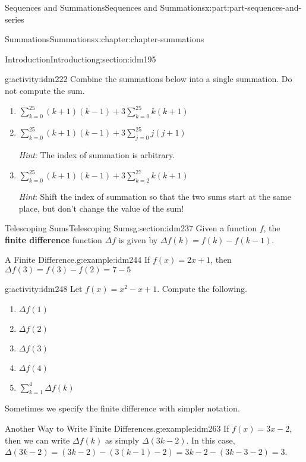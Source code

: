 \documentclass[oneside,10pt,]{book}
\newcommand{\terminology}[1]{\textbf{#1}}
\numberwithin{equation}{section}
\begin{document}
\begin{partptx}{Sequences and Summations}{}{Sequences and Summations}{}{}{x:part:part-sequences-and-series}
\begin{chapterptx}{Summations}{}{Summations}{}{}{x:chapter:chapter-summations}
\begin{sectionptx}{Introduction}{}{Introduction}{}{}{g:section:idm195}
\begin{activity}{}{g:activity:idm222}
Combine the summations below into a single summation. Do not compute the sum.%
\begin{enumerate}[font=\bfseries,label=(\alph*),ref=\alph*]
\item{}\(\displaystyle\sum_{k=0}^{25} (k+1)(k-1) + 3\sum_{k=0}^{25} k(k+1)\)\item{}\(\displaystyle\sum_{k=0}^{25} (k+1)(k-1) + 3\sum_{j=0}^{25} j(j+1)\)%
\par
\emph{Hint}: The index of summation is arbitrary.%
\item{}\(\displaystyle\sum_{k=0}^{25} (k+1)(k-1) + 3\sum_{k=2}^{27} k(k+1)\)%
\par
\emph{Hint}: Shift the index of summation so that the two sums start at the same place, but don't change the value of the sum!%
\end{enumerate}
\end{activity}
\end{sectionptx}
%
%
\typeout{************************************************}
\typeout{************************************************}
%
\begin{sectionptx}{Telescoping Sums}{}{Telescoping Sums}{}{}{g:section:idm237}
Given a function \(f\), the \terminology{finite difference} function \(\Delta f\) is given by \(\Delta f(k) = f(k) - f(k-1)\).%
\begin{example}{A Finite Difference.}{g:example:idm244}%
 If \(f(x) = 2x+1\), then \(\Delta f(3) = f(3) - f(2) = 7-5\)\end{example}
\begin{activity}{}{g:activity:idm248}%
Let \(f(x) = x^2-x+1\). Compute the following.%
\begin{enumerate}[font=\bfseries,label=(\alph*),ref=\alph*]
\item{}\(\Delta f(1)\)\item{}\(\Delta f(2)\)\item{}\(\Delta f(3)\)\item{}\(\Delta f(4)\)\item{}\(\displaystyle\sum_{k=1}^4\Delta f(k)\)\end{enumerate}
\end{activity}
Sometimes we specify the finite difference with simpler notation.%
\begin{example}{Another Way to Write Finite Differences.}{g:example:idm263}%
If \(f(x) = 3x-2\), then we can write \(\Delta f(k)\) as simply \(\Delta (3k-2)\). In this case, \(\Delta (3k-2) = (3k-2) - (3(k-1)-2) = 3k - 2 - (3k - 3 -2) = 3\).%

\end{example}
\end{sectionptx}
\end{chapterptx}
\end{partptx}
\end{document}
